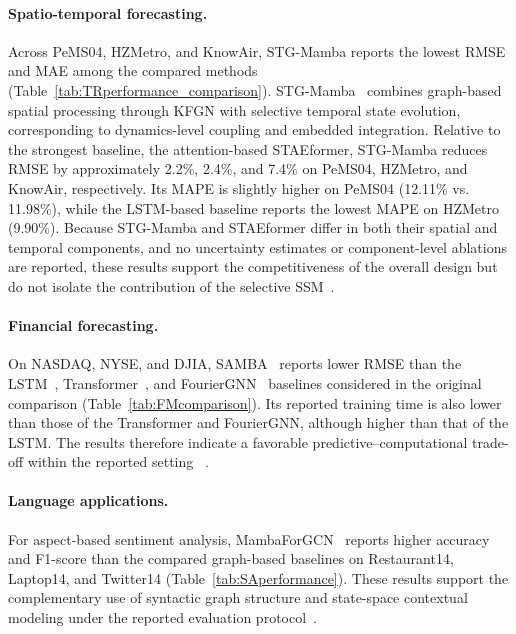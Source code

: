\documentclass[acmsmall]{acmart}
\begin{document}
\paragraph{\textbf{Spatio-temporal forecasting.}}
Across PeMS04, HZMetro, and KnowAir, STG-Mamba reports the
lowest RMSE and MAE among the compared methods
(Table~\ref{tab:TRperformance_comparison}). STG-Mamba~\cite{li2024stg}
combines graph-based spatial processing through KFGN with selective temporal
state evolution, corresponding to dynamics-level coupling and embedded
integration. Relative to the strongest baseline, the attention-based
STAEformer, STG-Mamba reduces RMSE by approximately 2.2\%, 2.4\%, and 7.4\%
on PeMS04, HZMetro, and KnowAir, respectively. Its MAPE is slightly higher on
PeMS04 (12.11\% vs. 11.98\%), while the LSTM-based baseline reports the lowest
MAPE on HZMetro (9.90\%). Because STG-Mamba and STAEformer differ in both
their spatial and temporal components, and no uncertainty estimates or
component-level ablations are reported, these results support the
competitiveness of the overall design but do not isolate the contribution of
the selective SSM~\cite{li2024stg}.

\paragraph{\textbf{Financial forecasting.}}
On NASDAQ, NYSE, and DJIA, SAMBA~\cite{mehrabian2024mamba} reports lower RMSE
than the LSTM~\cite{moghar2020stock}, Transformer~\cite{wang2022stock}, and
FourierGNN~\cite{yi2024fouriergnn} baselines considered in the original
comparison (Table~\ref{tab:FMcomparison}). Its reported training time is also
lower than those of the Transformer and FourierGNN, although higher than that
of the LSTM. The results therefore indicate a favorable
predictive--computational trade-off within the reported setting
~\cite{mehrabian2024mamba}.

\paragraph{\textbf{Language applications.}}
For aspect-based sentiment analysis, MambaForGCN~\cite{lawan2024mambaforgcn}
reports higher accuracy and F1-score than the compared graph-based baselines on
Restaurant14, Laptop14, and Twitter14
(Table~\ref{tab:SAperformance}). These results support the complementary use of
syntactic graph structure and state-space contextual modeling under the reported
evaluation protocol~\cite{lawan2024mambaforgcn}.
\end{document}
